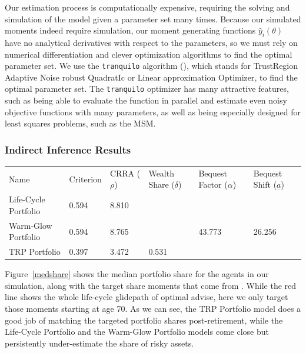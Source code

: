 \documentclass{article}
\newcommand{\CRRA}{\rho}
\begin{document}
Our estimation process is computationally expensive, requiring the solving and simulation of the model given a parameter set many times. Because our simulated moments indeed require simulation, our moment generating functions $\hat{y}_i(\theta)$ have no analytical derivatives with respect to the parameters, so we must rely on numerical differentiation and clever optimization algorithms to find the optimal parameter set. We use the \texttt{tranquilo} algorithm (\cite{Gabler2024}), which stands for TrustRegion Adaptive Noise robust QuadratIc or Linear approximation Optimizer, to find the optimal parameter set. The \texttt{tranquilo} optimizer has many attractive features, such as being able to evaluate the function in parallel and estimate even noisy objective functions with many parameters, as well as being especially designed for least squares problems, such as the MSM.

\subsubsection{Indirect Inference Results}

\bigskip\noindent
\begin{tabular}{p{}p{}p{}p{}p{}p{}}
\toprule
Name & Criterion & CRRA ($\CRRA$) & Wealth Share ($\delta$) & Bequest Factor ($\alpha$) & Bequest Shift ($\underline{a}$) \\
Life-Cycle Portfolio & 0.594 & 8.810 &  &  &  \\
Warm-Glow Portfolio & 0.594 & 8.765 &  & 43.773 & 26.256 \\
TRP Portfolio & 0.397 & 3.472 & 0.531 &  &  \\
\bottomrule
\end{tabular}

\bigskipFigure Figure~\ref{medshare} shows the median portfolio share for the agents in our simulation, along with the target share moments that come from \cite{Aboagye2024}. While the red line shows the whole life-cycle glidepath of optimal advise, here we only target those moments starting at age 70. As we can see, the TRP Portfolio model does a good job of matching the targeted portfolio shares post-retirement, while the Life-Cycle Portfolio and the Warm-Glow Portfolio models come close but persistently under-estimate the share of risky assets.
\end{document}
